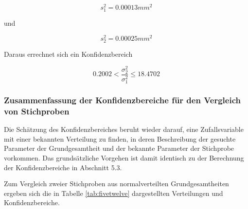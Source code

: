 \begin{equation}\label{eq:fivehundredten}
s_{1}^{2} =0.00013 mm^{2}
\end{equation}

\noindent und

\begin{equation}\label{eq:fivehundredeleven}
s_{2}^{2} =0.00025 mm^{2}
\end{equation}

\noindent Daraus errechnet sich ein Konfidenzbereich

\begin{equation}\label{eq:fivehundredtwelve}
0.2002<\dfrac{\sigma _{2}^{2}}{\sigma _{1}^{2}} \le 18.4702
\end{equation}

\clearpage

\subsubsection{Zusammenfassung der Konfidenzbereiche f\"{u}r den Vergleich von Stichproben}

\noindent Die Sch\"{a}tzung des Konfidenzbereiches beruht wieder darauf, eine Zufallsvariable mit einer bekannten Verteilung zu finden, in deren Beschreibung der gesuchte Parameter der Grundgesamtheit und der bekannte Parameter der Stichprobe vorkommen. Das grunds\"{a}tzliche Vorgehen ist damit identisch zu der Berechnung der Konfidenzbereiche in Abschnitt 5.3.\newline

\noindent Zum Vergleich zweier Stichproben aus normalverteilten Grundgesamtheiten ergeben sich die in Tabelle \ref{tab:fivetwelve} dargestellten Verteilungen und Konfidenzbereiche.

